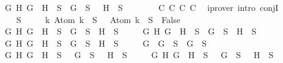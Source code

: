 \begin{isabellebody}
\ \ \ \ {\isasymand}\ {\isacharparenleft}{\isasymforall}G\ H{\isachardot}\ \isactrlbold {\isasymnot}{\isacharparenleft}G\ \isactrlbold {\isasymrightarrow}\ H{\isacharparenright}\ {\isasymin}\ S\ {\isasymlongrightarrow}\ G\ {\isasymin}\ S\ {\isasymand}\ \isactrlbold {\isasymnot}\ H\ {\isasymin}\ S{\isacharparenright}{\isachardoublequoteclose}\isanewline
\ \ \ \ \ \ \isamarkupfalse%
\ C{}\ C{}\ C{}\ C{}\ \isamarkupfalse%
\ {\isacharparenleft}iprover\ intro{\isacharcolon}\ conjI{\isacharparenright}\isanewline
\ \ \ \ \isamarkupfalse%
\ {\isachardoublequoteopen}{\isacharparenleft}{\isasymbottom}\ {\isasymnotin}\ S\isanewline
\ \ \ \ {\isasymand}\ {\isacharparenleft}{\isasymforall}k{\isachardot}\ Atom\ k\ {\isasymin}\ S\ {\isasymlongrightarrow}\ \isactrlbold {\isasymnot}\ {\isacharparenleft}Atom\ k{\isacharparenright}\ {\isasymin}\ S\ {\isasymlongrightarrow}\ False{\isacharparenright}\isanewline
\ \ \ \ {\isasymand}\ {\isacharparenleft}{\isasymforall}G\ H{\isachardot}\ G\ \isactrlbold {\isasymand}\ H\ {\isasymin}\ S\ {\isasymlongrightarrow}\ G\ {\isasymin}\ S\ {\isasymand}\ H\ {\isasymin}\ S{\isacharparenright}\isanewline
\ \ \ \ {\isasymand}\ {\isacharparenleft}{\isasymforall}G\ H{\isachardot}\ G\ \isactrlbold {\isasymor}\ H\ {\isasymin}\ S\ {\isasymlongrightarrow}\ G\ {\isasymin}\ S\ {\isasymor}\ H\ {\isasymin}\ S{\isacharparenright}\isanewline
\ \ \ \ {\isasymand}\ {\isacharparenleft}{\isasymforall}G\ H{\isachardot}\ G\ \isactrlbold {\isasymrightarrow}\ H\ {\isasymin}\ S\ {\isasymlongrightarrow}\ \isactrlbold {\isasymnot}G\ {\isasymin}\ S\ {\isasymor}\ H\ {\isasymin}\ S{\isacharparenright}{\isacharparenright}\isanewline
\ \ \ \ {\isasymand}\ {\isacharparenleft}{\isacharparenleft}{\isasymforall}G{\isachardot}\ \isactrlbold {\isasymnot}\ {\isacharparenleft}\isactrlbold {\isasymnot}G{\isacharparenright}\ {\isasymin}\ S\ {\isasymlongrightarrow}\ G\ {\isasymin}\ S{\isacharparenright}\isanewline
\ \ \ \ {\isasymand}\ {\isacharparenleft}{\isasymforall}G\ H{\isachardot}\ \isactrlbold {\isasymnot}{\isacharparenleft}G\ \isactrlbold {\isasymand}\ H{\isacharparenright}\ {\isasymin}\ S\ {\isasymlongrightarrow}\ \isactrlbold {\isasymnot}\ G\ {\isasymin}\ S\ {\isasymor}\ \isactrlbold {\isasymnot}\ H\ {\isasymin}\ S{\isacharparenright}\isanewline
\ \ \ \ {\isasymand}\ {\isacharparenleft}{\isasymforall}G\ H{\isachardot}\ \isactrlbold {\isasymnot}{\isacharparenleft}G\ \isactrlbold {\isasymor}\ H{\isacharparenright}\ {\isasymin}\ S\ {\isasymlongrightarrow}\ \isactrlbold {\isasymnot}\ G\ {\isasymin}\ S\ {\isasymand}\ \isactrlbold {\isasymnot}\ H\ {\isasymin}\ S{\isacharparenright}\isanewline

\end{isabellebody}
